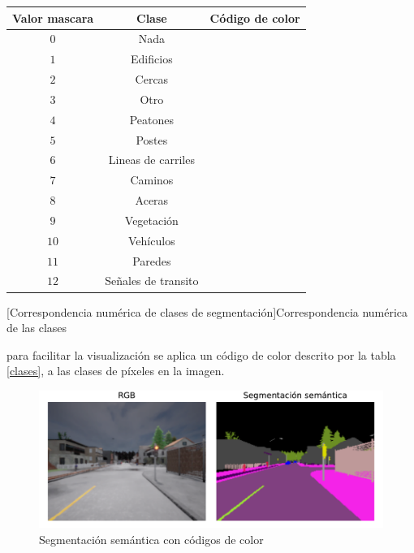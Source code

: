 \begin{center}
	\footnotesize
	\begin{tabular}{|c|c|c|}
		\hline
		Valor mascara & Clase & Código de color\\
		\hline
		$0$ & Nada & \cellcolor{none}\\
		\hline
		$1$ & Edificios & \cellcolor{buildings}\\
		\hline
		$2$ & Cercas & \cellcolor{fences}\\
		\hline
		$3$ & Otro & \cellcolor{other}\\
		\hline
		$4$ & Peatones & \cellcolor{pedestrians}\\
		\hline
		$5$ & Postes & \cellcolor{poles}\\
		\hline
		$6$ & Lineas de carriles & \cellcolor{roadlines}\\
		\hline
		$7$ & Caminos & \cellcolor{roads}\\
		\hline
		$8$ & Aceras & \cellcolor{sidewalks}\\
		\hline
		$9$ & Vegetación & \cellcolor{vegetation}\\
		\hline
		$10$ & Vehículos & \cellcolor{vehicles}\\
		\hline
		$11$ & Paredes & \cellcolor{walls}\\
		\hline
		$12$ & Señales de transito & \cellcolor{trafficsigns}\\
		\hline
	\end{tabular}
	[Correspondencia numérica de clases de segmentación]{Correspondencia numérica de las clases}\label{clases}
\end{center}

para facilitar la visualización se aplica un código de color descrito por la tabla \ref{clases}, a las clases de píxeles en la imagen.

\begin{figure}[H]
	\centering
	\includegraphics[scale=0.6]{imagenes/semseg}
	\caption[Segmentación semántica con códigos de color]{Segmentación semántica con códigos de color}
	\label{semseg}
\end{figure}

